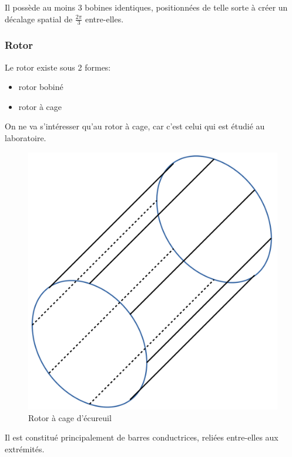 \documentclass[11pt]{article}
\providecommand{\tightlist}{%
      \setlength{\itemsep}{0pt}\setlength{\parskip}{0pt}}
\begin{document}
    Il possède au moins 3 bobines identiques, positionnées de telle sorte à
créer un décalage spatial de \(\frac{2\pi}{3}\) entre-elles.

    \hypertarget{rotor}{%
\subsubsection{Rotor}\label{rotor}}

    Le rotor existe sous 2 formes:

\begin{itemize}
\tightlist
\item
  rotor bobiné
\item
  rotor à cage
\end{itemize}

    On ne va s'intéresser qu'au rotor à cage, car c'est celui qui est étudié
au laboratoire.

    \begin{figure}[!hbt]
        \centering
        \includegraphics{Images/MAS/rotor_cage.png}
        \caption{Rotor à cage d'écureuil}
    \end{figure}

    Il est constitué principalement de barres conductrices, reliées
entre-elles aux extrémités.
\end{document}
